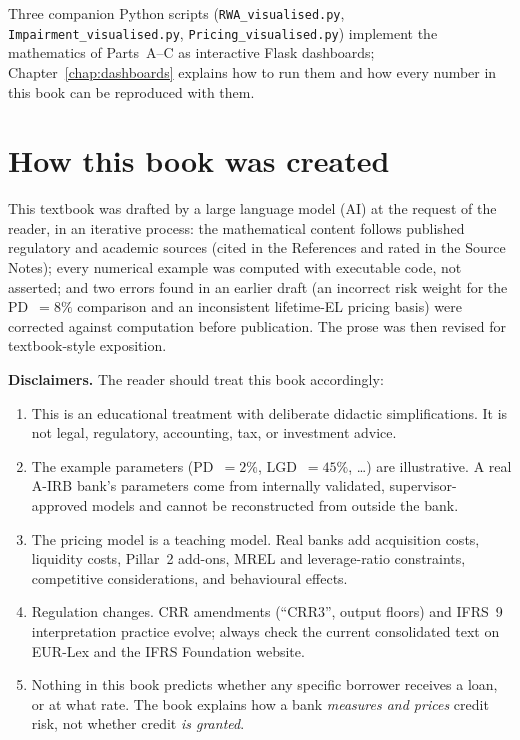 \documentclass[11pt,a4paper]{report}
\theoremstyle{definition}
\theoremstyle{plain}
\begin{document}
Three companion Python scripts (\texttt{RWA\_visualised.py},
\texttt{Impairment\_visualised.py}, \texttt{Pricing\_visualised.py})
implement the mathematics of Parts~A--C as interactive Flask dashboards;
Chapter~\ref{chap:dashboards} explains how to run them and how every
number in this book can be reproduced with them.

\section{How this book was created}

This textbook was drafted by a large language model (AI) at the request
of the reader, in an iterative process: the mathematical content follows
published regulatory and academic sources (cited in the References and
rated in the Source Notes); every numerical example was computed with
executable code, not asserted; and two errors found in an earlier draft
(an incorrect risk weight for the PD~$=8\%$ comparison and an
inconsistent lifetime-EL pricing basis) were corrected against
computation before publication. The prose was then revised for
textbook-style exposition.

\textbf{Disclaimers.} The reader should treat this book accordingly:

\begin{enumerate}
  \item This is an educational treatment with deliberate didactic
        simplifications. It is not legal, regulatory, accounting, tax,
        or investment advice.
  \item The example parameters (PD~$=2\%$, LGD~$=45\%$, \dots) are
        illustrative. A real A-IRB bank's parameters come from internally
        validated, supervisor-approved models and cannot be reconstructed
        from outside the bank.
  \item The pricing model is a teaching model. Real banks add acquisition
        costs, liquidity costs, Pillar~2 add-ons, MREL and
        leverage-ratio constraints, competitive considerations, and
        behavioural effects.
  \item Regulation changes. CRR amendments (``CRR3'', output floors) and
        IFRS~9 interpretation practice evolve; always check the current
        consolidated text on EUR-Lex and the IFRS Foundation website.
  \item Nothing in this book predicts whether any specific borrower
        receives a loan, or at what rate. The book explains how a bank
        \emph{measures and prices} credit risk, not whether credit
        \emph{is granted}.
\end{enumerate}
\end{document}
